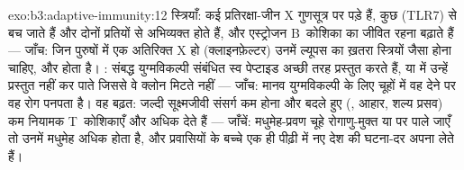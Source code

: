 \begin{solution}{exo:b3:adaptive-immunity:12}
स्त्रियाँ: कई प्रतिरक्षा-जीन X गुणसूत्र पर पड़े हैं, कुछ (TLR7)
 से बच जाते हैं और दोनों प्रतियों से अभिव्यक्त होते हैं, और
एस्ट्रोजन B~कोशिका का जीवित रहना बढ़ाते हैं --- जाँच: जिन पुरुषों में
एक अतिरिक्त X हो (क्लाइनफ़ेल्टर) उनमें ल्यूपस का ख़तरा स्त्रियों जैसा
होना चाहिए, और होता है। : संबद्ध युग्मविकल्पी संबंधित स्व पेप्टाइड
अच्छी तरह प्रस्तुत करते हैं, या  में उन्हें प्रस्तुत नहीं कर पाते
जिससे वे क्लोन मिटते नहीं --- जाँच: मानव युग्मविकल्पी के लिए
 चूहों में वह  देने पर वह रोग पनपता है। वह बढ़त: जल्दी
सूक्ष्मजीवी संसर्ग कम होना और बदले हुए  (, आहार,
शल्य प्रसव) कम नियामक T~कोशिकाएँ और अधिक  देते हैं --- जाँचें:
मधुमेह-प्रवण चूहे रोगाणु-मुक्त या  पर पाले जाएँ तो उनमें
मधुमेह अधिक होता है, और प्रवासियों के बच्चे एक ही पीढ़ी में नए देश की
घटना-दर अपना लेते हैं।
\end{solution}

